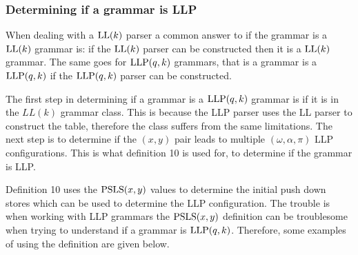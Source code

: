 \subsubsection{Determining if a grammar is LLP}
When dealing with a $\text{LL}(k)$ parser a common answer to if the grammar is a $\text{LL}(k)$ grammar is: if the $\text{LL}(k)$ parser can be constructed then it is a $\text{LL}(k)$ grammar. The same goes for $\text{LLP}(q,k)$ grammars, that is a grammar is a $\text{LLP}(q,k)$ if the $\text{LLP}(q, k)$ parser can be constructed.

The first step in determining if a grammar is a $\text{LLP}(q,k)$ grammar is if it is in the $LL(k)$ grammar class. This is because the LLP parser uses the LL parser to construct the table, therefore the class suffers from the same limitations. The next step is to determine if the $(x, y)$ pair leads to multiple $(\omega, \alpha, \pi)$ LLP configurations. This is what definition 10 \cite[13]{Vagner2007} is used for, to determine if the grammar is LLP.

Definition 10 \cite[13]{Vagner2007} uses the $\text{PSLS}(x, y)$ \cite[12]{Vagner2007} values to determine the initial push down stores which can be used to determine the LLP configuration. The trouble is when working with LLP grammars the $\text{PSLS}(x, y)$ definition can be troublesome when trying to understand if a grammar is $\text{LLP}(q, k)$. Therefore, some examples of using the definition are given below.

